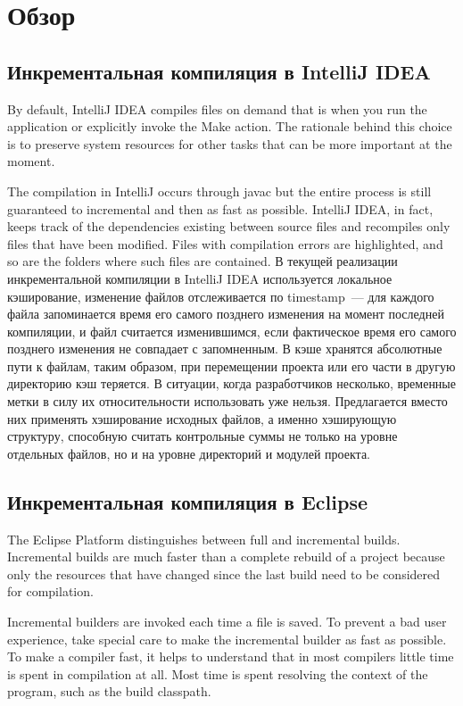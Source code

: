 \section{Обзор}

\subsection{Инкрементальная компиляция в IntelliJ IDEA}
By default, IntelliJ IDEA compiles files on demand that is when you run the application or explicitly invoke the Make action. The rationale behind this choice is to preserve system resources for other tasks that can be more important at the moment.

The compilation in IntelliJ occurs through javac but the entire process is still guaranteed to incremental and then as fast as possible. IntelliJ IDEA, in fact, keeps track of the dependencies existing between source files and recompiles only files that have been modified. Files with compilation errors are highlighted, and so are the folders where such files are contained.
В текущей реализации инкрементальной компиляции в IntelliJ IDEA используется локальное кэширование, изменение файлов отслеживается по timestamp~--- для каждого файла запоминается время его самого позднего изменения на момент последней компиляции, и файл считается изменившимся, если фактическое время его самого позднего изменения не совпадает с запомненным. В кэше хранятся абсолютные пути к файлам, таким образом, при перемещении проекта или его части в другую директорию кэш теряется. В ситуации, когда разработчиков несколько, временные метки в силу их относительности использовать уже нельзя. Предлагается вместо них применять хэширование исходных файлов, а именно хэширующую структуру, способную считать контрольные суммы не только на уровне отдельных файлов, но и на уровне директорий и модулей проекта.

\subsection{Инкрементальная компиляция в Eclipse}
The Eclipse Platform distinguishes between full and incremental builds. Incremental builds are much faster than a complete rebuild of a project because only the resources that have changed since the last build need to be considered for compilation.

Incremental builders are invoked each time a file is saved. To prevent a bad user experience, take special care to make the incremental builder as fast as possible. To make a compiler fast, it helps to understand that in most compilers little time is spent in compilation at all. Most time is spent resolving the context of the program, such as the build classpath.

